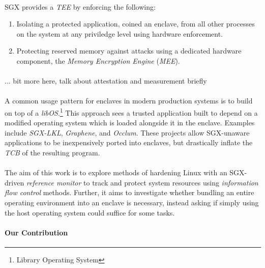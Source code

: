 \paragraph{} SGX provides a \textit{TEE} by enforcing the following:

\begin{enumerate}
    \item Isolating a protected application, coined an enclave, from all other processes on the system at any priviledge level using hardware enforcement.
    \item Protecting reserved memory against attacks using a dedicated hardware component, the \textit{Memory Encryption Engine} (\textit{MEE}). 
\end{enumerate}

\paragraph{} ... bit more here, talk about attestation and measurement briefly

\paragraph{} A common usage pattern for enclaves in modern production systems is to build on top of a \textit{libOS}.\footnote{Library Operating System} This approach sees a trusted application built to depend on a modified operating system which is loaded alongside it in the enclave. Examples include \textit{SGX-LKL}, \textit{Graphene}, and \textit{Occlum}. These projects allow SGX-unaware applications to be inexpensively ported into enclaves, but drastically inflate the \textit{TCB} of the resulting program.

\paragraph{} The aim of this work is to explore methods of hardening Linux with an SGX-driven \textit{reference monitor} to track and protect system resources using \textit{information flow control} methods. Further, it aims to investigate whether bundling an entire operating environment into an enclave is necessary, instead asking if simply using the host operating system could suffice for some tasks.


\paragraph{Our Contribution}

